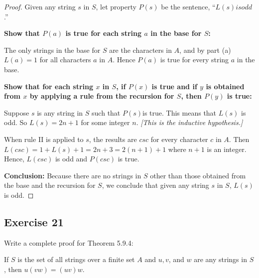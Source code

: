 \documentclass[14pt]{extarticle}
\begin{document}
\begin{proof}
Given any string $s$ in $S$, let property $P(s)$ be the sentence, “$L(s) is odd$.”

{\bf Show that $P(a)$ is true for each string $a$ in the base for $S$:}

The only strings in the base for $S$ are the characters in $A$, and by part (a) $L(a) = 1$ for all characters $a$ in 
$A$. Hence $P(a)$ is true for every string $a$ in the base. 

{\bf Show that for each string $x$ in $S$, if $P(x)$ is true and if $y$ is obtained from $x$ by applying a rule 
from the recursion for $S$, then $P(y)$ is true:}

Suppose $s$ is any string in $S$ such that $P(s)$is true. This means that $L(s)$ is odd. So $L(s) = 2n+1$ for some 
integer $n$. {\it [This is the inductive hypothesis.]}

When rule II is applied to $s$, the results are $csc$ for every character $c$ in $A$. Then 
\(L(csc) = 1 + L(s) + 1 = 2n+3 = 2(n+1) + 1\) where $n+1$ is an integer. Hence, $L(csc)$ is odd and $P(csc)$ is true. 

{\bf Conclusion:} Because there are no strings in $S$ other than those obtained from the base and the recursion for 
$S$, we conclude that given any string $s$ in $S$, \(L(s)\) is odd.
\end{proof}

\subsection{Exercise 21}
Write a complete proof for Theorem 5.9.4:

If $S$ is the set of all strings over a finite set $A$ and $u, v$, and $w$ are any strings in $S$, then \(u(vw) = (uv)w\).
\end{document}
